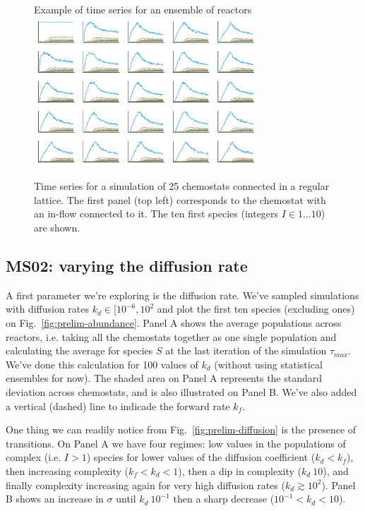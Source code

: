 \documentclass[11pt]{article}
\begin{document}
\begin{figure}[hbt]
  \centering
  {\LARGE Example of time series for an ensemble of reactors}\vspace{1em}\\
  \includegraphics[width=0.75\textwidth]{figures/results/1-prelim/ts-gridplot.pdf}
  \caption{Time series for a simulation of 25 chemostats connected in a regular lattice. The first panel (top left) corresponds to the chemostat with an in-flow connected to it. The ten first species (integers $I\in{1...10}$) are shown.}
  \label{fig:time-series}
\end{figure}

\clearpage

\subsection{MS02: varying the diffusion rate}
\label{subsec:MS02}

A first parameter we’re exploring is the diffusion rate. We’ve sampled simulations with diffusion rates $k_d\in[10^{-6},10^{2}$ and plot the first ten species (excluding ones) on Fig.~\ref{fig:prelim-abundance}. Panel A shows the average populations across reactors, i.e. taking all the chemostats together as one single population and calculating the average for species $S$ at the last iteration of the simulation $\tau_{max}$. We’ve done this calculation for 100 values of $k_d$ (without using statistical ensembles for now). The shaded area on Panel A represents the standard deviation across chemostats, and is also illustrated on Panel B. We’ve also added a vertical (dashed) line to indicade the forward rate $k_f$. 

One thing we can readily notice from Fig.~\ref{fig:prelim-diffusion} is the presence of transitions. On Panel A we have four regimes: low values in the populations of complex (i.e. $I>1$) species for lower values of the diffusion coefficient ($k_d < k_f$), then increasing complexity ($k_f < k_d < 1$), then a dip in complexity ($k_d ~ 10$), and finally complexity increasing again for very high diffusion rates ($k_d \gtrsim 10^2$). Panel B shows an increase in $\sigma$ until $k_d ~ 10^{-1}$ then a sharp decrease ($10^{-1} < k_d < 10$).
\end{document}
